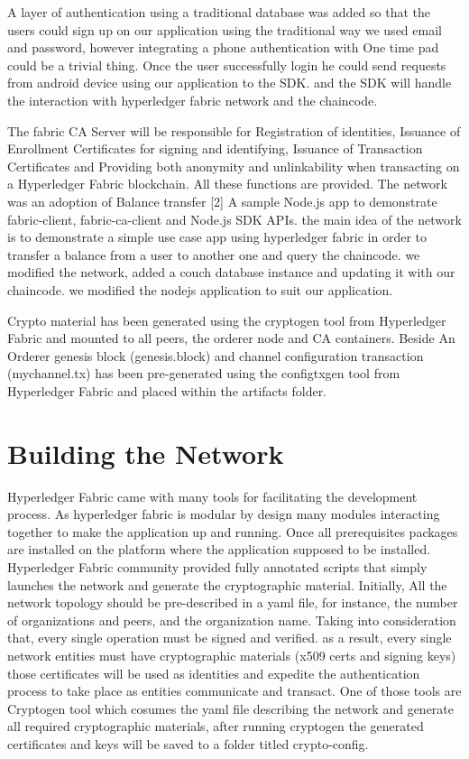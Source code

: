 A layer of authentication using a traditional database was added so that the users could sign up on our application using the traditional way we used email and password, however integrating a phone authentication with One time pad could be a trivial thing. 
Once the user successfully login he could send requests from android device using our application to the SDK. and the SDK will handle the interaction with hyperledger fabric network and the chaincode. 
 
The fabric CA Server will be responsible for Registration of identities, Issuance of Enrollment Certificates for signing and identifying, Issuance of Transaction Certificates and Providing both anonymity and unlinkability when transacting on a Hyperledger Fabric blockchain. All these functions are provided.
The network was an adoption of Balance transfer [2] A sample Node.js app to demonstrate fabric-client, fabric-ca-client and Node.js SDK APIs. 
the main idea of the network is to demonstrate a simple use case app using hyperledger fabric in order to transfer a balance from a user to another one and query the chaincode. we modified the network, added a couch database instance and updating it with our chaincode. we modified the nodejs application to suit our application. 

Crypto material has been generated using the cryptogen tool from Hyperledger Fabric and mounted to all peers, the orderer node and CA containers. 
Beside An Orderer genesis block (genesis.block) and channel configuration transaction (mychannel.tx) has been pre-generated using the configtxgen tool from Hyperledger Fabric and placed within the artifacts folder. 

\section{Building the Network} 

Hyperledger Fabric came with many tools for facilitating the development process. As hyperledger fabric is modular by design many modules interacting together to make the application up and running.  
Once all prerequisites packages are installed on the platform where the application supposed to be installed. Hyperledger Fabric community provided fully annotated scripts that simply launches the network and generate the cryptographic material.
Initially, All the network topology should be pre-described in a yaml file, for instance, the number of organizations and peers, and the organization name. 
Taking into consideration that, every single operation must be signed and verified. as a result, every single network entities must have cryptographic materials (x509 certs and signing keys) those certificates will be used as identities and expedite the authentication process to take place as entities communicate and transact. 
One of those tools are Cryptogen tool which cosumes the yaml file describing the network and generate all required cryptographic materials, after running cryptogen the generated certificates and keys will be saved to a folder titled crypto-config.
 
